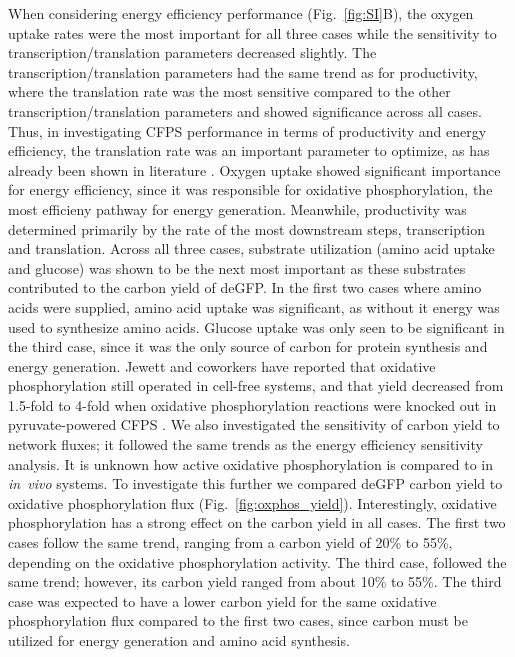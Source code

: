 \documentclass[journal=asbcd6,manuscript=article]{achemso}
\begin{document}
When considering energy efficiency performance (Fig.~\ref{fig:SI}B), the oxygen uptake rates were the most important for all three cases while the sensitivity to transcription/translation parameters decreased slightly.
The transcription/translation parameters had the same trend as for productivity, where the translation rate was the most sensitive compared to the other transcription/translation parameters and showed significance across all cases.
Thus, in investigating CFPS performance in terms of productivity and energy efficiency, the translation rate was an important parameter to optimize, as has already been shown in literature \cite{2005_underwood_biotech, 2014_li_PlosOne}.
Oxygen uptake showed significant importance for energy efficiency, since it was responsible for oxidative phosphorylation, the most efficieny pathway for energy generation.
Meanwhile, productivity was determined primarily by the rate of the most downstream steps, transcription and translation.
Across all three cases, substrate utilization (amino acid uptake and glucose) was shown to be the next most important as these substrates contributed to the carbon yield of deGFP.
In the first two cases where amino acids were supplied, amino acid uptake was significant, as without it energy was used to synthesize amino acids.
Glucose uptake was only seen to be significant in the third case, since it was the only source of carbon for protein synthesis and energy generation.
Jewett and coworkers have reported that oxidative phosphorylation still operated in cell-free systems, and that yield decreased from 1.5-fold to 4-fold when oxidative phosphorylation reactions were knocked out in pyruvate-powered CFPS \cite{Jewett:2008aa}.
We also investigated the sensitivity of carbon yield to network fluxes; it followed the same trends as the energy efficiency sensitivity analysis.
It is unknown how active oxidative phosphorylation is compared to in \textit{in~vivo} systems.
To investigate this further we compared deGFP carbon yield to oxidative phosphorylation flux (Fig.~\ref{fig:oxphos_yield}).
Interestingly, oxidative phosphorylation has a strong effect on the carbon yield in all cases.
The first two cases follow the same trend, ranging from a carbon yield of 20\% to 55\%, depending on the oxidative phosphorylation activity.
The third case, followed the same trend; however, its carbon yield ranged from about 10\% to 55\%.  
The third case was expected to have a lower carbon yield for the same oxidative phosphorylation flux compared to the first two cases, since carbon must be utilized for energy generation and amino acid synthesis.
\end{document}
